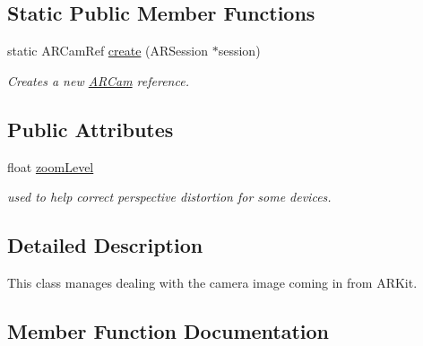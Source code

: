 \subsection*{Static Public Member Functions}
\begin{DoxyCompactItemize}
\item 
\mbox{\label{class_a_r_core_1_1_a_r_cam_ad4a6c0ebf786ea4e745cc8e95790681a}} 
static A\+R\+Cam\+Ref \hyperlink{class_a_r_core_1_1_a_r_cam_ad4a6c0ebf786ea4e745cc8e95790681a}{create} (A\+R\+Session $\ast$session)
\begin{DoxyCompactList}\small\item\em Creates a new \hyperlink{class_a_r_core_1_1_a_r_cam}{A\+R\+Cam} reference. \end{DoxyCompactList}\end{DoxyCompactItemize}
\subsection*{Public Attributes}
\begin{DoxyCompactItemize}
\item 
\mbox{\label{class_a_r_core_1_1_a_r_cam_ac17d3b7fd12f51b2c54b7241efd36cd4}} 
float \hyperlink{class_a_r_core_1_1_a_r_cam_ac17d3b7fd12f51b2c54b7241efd36cd4}{zoom\+Level}
\begin{DoxyCompactList}\small\item\em used to help correct perspective distortion for some devices. \end{DoxyCompactList}\end{DoxyCompactItemize}


\subsection{Detailed Description}
This class manages dealing with the camera image coming in from A\+R\+Kit. 

\subsection{Member Function Documentation}
\mbox{\label{class_a_r_core_1_1_a_r_cam_ac554b8254ea4a22f122f25542694dafa}} 

